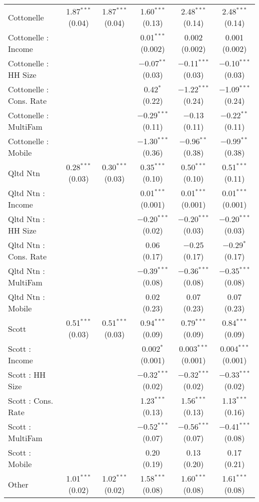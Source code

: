 \begin{table}[!htbp]
\begin{tabular}{@{\extracolsep{5pt}}lccccc}
  Cottonelle & 1.87$^{***}$ (0.04) & 1.87$^{***}$ (0.04) & 1.60$^{***}$ (0.13) & 2.48$^{***}$ (0.14) & 2.48$^{***}$ (0.14) \\ 
  Cottonelle : Income &  &  & 0.01$^{***}$ (0.002) & 0.002 (0.002) & 0.001 (0.002) \\ 
  Cottonelle : HH Size &  &  & $-$0.07$^{**}$ (0.03) & $-$0.11$^{***}$ (0.03) & $-$0.10$^{***}$ (0.03) \\ 
  Cottonelle : Cons. Rate &  &  & 0.42$^{*}$ (0.22) & $-$1.22$^{***}$ (0.24) & $-$1.09$^{***}$ (0.24) \\ 
  Cottonelle : MultiFam &  &  & $-$0.29$^{***}$ (0.11) & $-$0.13 (0.11) & $-$0.22$^{**}$ (0.11) \\ 
  Cottonelle : Mobile &  &  & $-$1.30$^{***}$ (0.36) & $-$0.96$^{**}$ (0.38) & $-$0.99$^{**}$ (0.38) \\ 
  Qltd Ntn & 0.28$^{***}$ (0.03) & 0.30$^{***}$ (0.03) & 0.35$^{***}$ (0.10) & 0.50$^{***}$ (0.10) & 0.51$^{***}$ (0.11) \\ 
  Qltd Ntn : Income &  &  & 0.01$^{***}$ (0.001) & 0.01$^{***}$ (0.001) & 0.01$^{***}$ (0.001) \\ 
  Qltd Ntn : HH Size &  &  & $-$0.20$^{***}$ (0.02) & $-$0.20$^{***}$ (0.03) & $-$0.20$^{***}$ (0.03) \\ 
  Qltd Ntn : Cons. Rate &  &  & 0.06 (0.17) & $-$0.25 (0.17) & $-$0.29$^{*}$ (0.17) \\ 
  Qltd Ntn : MultiFam &  &  & $-$0.39$^{***}$ (0.08) & $-$0.36$^{***}$ (0.08) & $-$0.35$^{***}$ (0.08) \\ 
  Qltd Ntn : Mobile &  &  & 0.02 (0.23) & 0.07 (0.23) & 0.07 (0.23) \\ 
  Scott & 0.51$^{***}$ (0.03) & 0.51$^{***}$ (0.03) & 0.94$^{***}$ (0.09) & 0.79$^{***}$ (0.09) & 0.84$^{***}$ (0.09) \\ 
  Scott : Income &  &  & 0.002$^{*}$ (0.001) & 0.003$^{***}$ (0.001) & 0.004$^{***}$ (0.001) \\ 
  Scott : HH Size &  &  & $-$0.32$^{***}$ (0.02) & $-$0.32$^{***}$ (0.02) & $-$0.33$^{***}$ (0.02) \\ 
  Scott : Cons. Rate &  &  & 1.23$^{***}$ (0.13) & 1.56$^{***}$ (0.13) & 1.13$^{***}$ (0.16) \\ 
  Scott : MultiFam &  &  & $-$0.52$^{***}$ (0.07) & $-$0.56$^{***}$ (0.07) & $-$0.41$^{***}$ (0.08) \\ 
  Scott : Mobile &  &  & 0.20 (0.19) & 0.13 (0.20) & 0.17 (0.21) \\ 
  Other & 1.01$^{***}$ (0.02) & 1.02$^{***}$ (0.02) & 1.58$^{***}$ (0.08) & 1.60$^{***}$ (0.08) & 1.61$^{***}$ (0.08) \\ 

\end{tabular}
\end{table}
